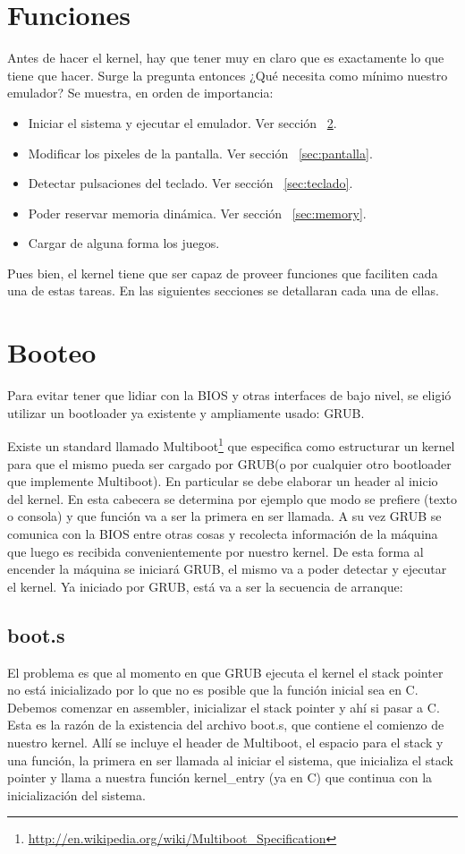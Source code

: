 \section{Funciones}
Antes de hacer el kernel, hay que tener muy en claro que es exactamente lo que tiene que hacer. Surge la pregunta entonces ¿Qué necesita como mínimo nuestro emulador? Se muestra, en orden de importancia:
\begin{itemize}
\item Iniciar el sistema y ejecutar el emulador. Ver sección ~\ref{sec:booteo}.
\item Modificar los pixeles de la pantalla. Ver sección ~\ref{sec:pantalla}.
\item Detectar pulsaciones del teclado. Ver sección ~\ref{sec:teclado}.
\item Poder reservar memoria dinámica. Ver sección ~\ref{sec:memory}.
\item Cargar de alguna forma los juegos.
\end{itemize}
Pues bien, el kernel tiene que ser capaz de proveer funciones que faciliten cada una de estas tareas. En las siguientes secciones se detallaran cada una de ellas.

\section{Booteo}\label{sec:booteo}
Para evitar tener que lidiar con la BIOS y otras interfaces de bajo nivel, se eligió utilizar un bootloader ya existente y ampliamente usado: GRUB.

Existe un standard llamado Multiboot\footnote{\url{http://en.wikipedia.org/wiki/Multiboot_Specification}} que especifica como estructurar un kernel para que el mismo pueda ser cargado por GRUB(o por cualquier otro bootloader que implemente Multiboot). En particular se debe elaborar un header al inicio del kernel. En esta cabecera se determina por ejemplo que modo se prefiere (texto o consola) y que función va a ser la primera en ser llamada. A su vez GRUB se comunica con la BIOS entre otras cosas y recolecta información de la máquina que luego es recibida convenientemente por nuestro kernel. De esta forma al encender la máquina se iniciará GRUB, el mismo va a poder detectar y ejecutar el kernel. Ya iniciado por GRUB, está va a ser la secuencia de arranque:

\subsection[boot.s]{boot.s\protect\footnotemark{}\protect{}}
El problema es que al momento en que GRUB ejecuta el kernel el stack pointer no está inicializado por lo que no es posible que la función inicial sea en C. Debemos comenzar en assembler, inicializar el stack pointer y ahí si pasar a C. Esta es la razón de la existencia del archivo boot.s, que contiene el comienzo de nuestro kernel. Allí se incluye el header de Multiboot, el espacio para el stack y una función, la primera en ser llamada al iniciar el sistema, que inicializa el stack pointer y llama a nuestra función kernel\_entry (ya en C) que continua con la inicialización del sistema.

